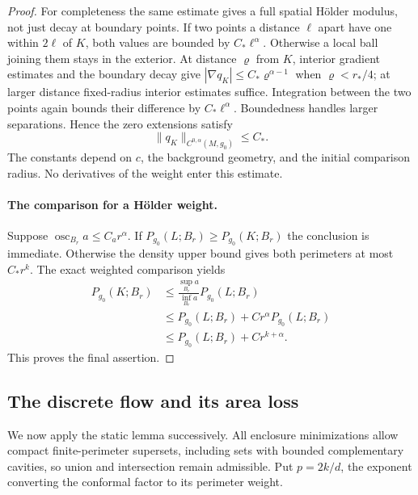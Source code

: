 \begin{proof}
For completeness the same estimate gives a full spatial H\"older
modulus, not just decay at boundary points. If two points a
distance $\ell$ apart have one within $2\ell$ of $K$, both
values are bounded by $C_*\ell^\alpha$. Otherwise a local ball
joining them stays in the exterior. At distance $\varrho$ from
$K$, interior gradient estimates and the boundary decay give
$|\nabla q_K|\le C_*\varrho^{\alpha-1}$ when
$\varrho<r_*/4$; at larger distance fixed-radius interior
estimates suffice. Integration between the two points again
bounds their difference by $C_*\ell^\alpha$. Boundedness
handles larger separations. Hence the zero extensions satisfy
\begin{equation}
\label{eq:rpi:flow-holder-input}
 \|q_K\|_{C^{0,\alpha}(M,g_0)}\le C_*.
\end{equation}
The constants depend on $c$, the background geometry, and the initial
comparison radius. No derivatives of the weight enter this estimate.

\paragraph{The comparison for a H\"older weight.}
Suppose $\operatorname{osc}_{B_r}a\le C_a r^\alpha$. If
$P_{g_0}(L;B_r)\ge P_{g_0}(K;B_r)$ the conclusion is immediate.
Otherwise the density upper bound gives both perimeters at most
$C_*r^k$. The exact weighted comparison yields
\[
 \begin{aligned}
 P_{g_0}(K;B_r)
 &\le\frac{\sup_{B_r}a}{\inf_{B_r}a}P_{g_0}(L;B_r)\\
 &\le P_{g_0}(L;B_r)+C r^\alpha P_{g_0}(L;B_r)\\
 &\le P_{g_0}(L;B_r)+C r^{k+\alpha}.
 \end{aligned}
\]
This proves the final assertion.
\end{proof}

\subsection{The discrete flow and its area loss}

We now apply the static lemma successively. All enclosure minimizations
allow compact finite-perimeter supersets, including sets with bounded
complementary cavities, so union and intersection remain admissible.
Put $p=2k/d$, the exponent converting the conformal factor to its
perimeter weight.


